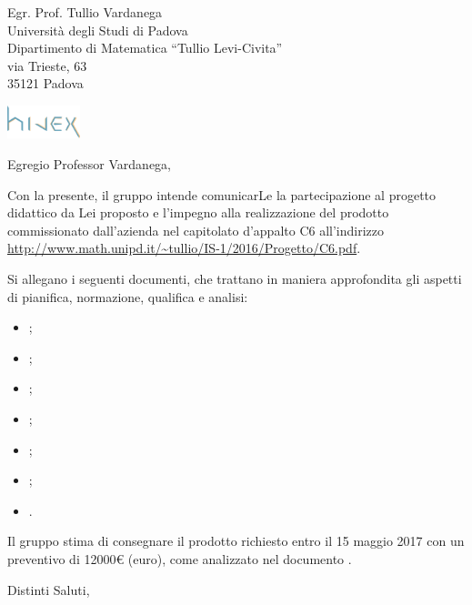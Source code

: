 \documentclass[a4paper]{letter} %
\date{Padova, \today}
\begin{document}
\begin{letter}{Egr. Prof. Tullio Vardanega\\
Università degli Studi di Padova\\
Dipartimento di Matematica “Tullio Levi-Civita”\\
via Trieste, 63\\
35121 Padova}

\includegraphics[width=80px]{../../util/hivex_logo3.png}

\opening{Egregio Professor Vardanega,}

Con la presente, il gruppo \hx{} intende comunicarLe la partecipazione al progetto didattico da Lei proposto e l'impegno alla realizzazione del prodotto \proj{} commissionato dall'azienda \ZU{} nel capitolato d'appalto C6 all'indirizzo \url{http://www.math.unipd.it/~tullio/IS-1/2016/Progetto/C6.pdf}.

Si allegano i seguenti documenti, che trattano in maniera approfondita gli aspetti di pianifica, normazione, qualifica e analisi:
\begin{itemize}
	\item \SdF;
	\item \NdP;
	\item \PdP;
	\item \PdQ;
	\item \AdR;
	\item \Glossario;
	\item \Verbali.
\end{itemize}



Il gruppo \hx{} stima di consegnare il prodotto richiesto entro il 15 maggio 2017 con un preventivo di \num{12000}\euro{} (euro), come analizzato nel documento \PdP.

\closing{Distinti Saluti,}

\end{letter}
\end{document}
